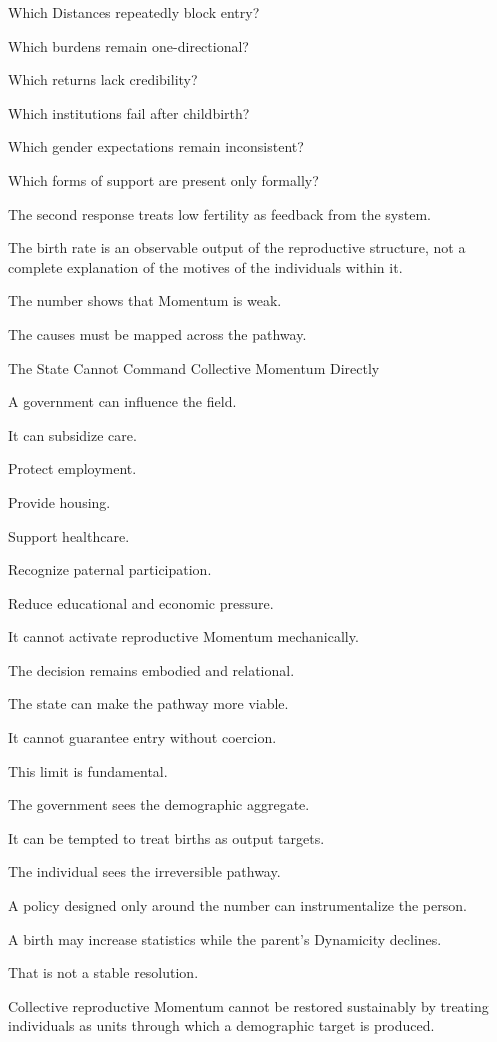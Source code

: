 Which Distances repeatedly block entry?

Which burdens remain one-directional?

Which returns lack credibility?

Which institutions fail after childbirth?

Which gender expectations remain inconsistent?

Which forms of support are present only formally?

The second response treats low fertility as feedback from the system.

The birth rate is an observable output of the reproductive structure, not a complete explanation of the motives of the individuals within it.

The number shows that Momentum is weak.

The causes must be mapped across the pathway.

The State Cannot Command Collective Momentum Directly

A government can influence the field.

It can subsidize care.

Protect employment.

Provide housing.

Support healthcare.

Recognize paternal participation.

Reduce educational and economic pressure.

It cannot activate reproductive Momentum mechanically.

The decision remains embodied and relational.

The state can make the pathway more viable.

It cannot guarantee entry without coercion.

This limit is fundamental.

The government sees the demographic aggregate.

It can be tempted to treat births as output targets.

The individual sees the irreversible pathway.

A policy designed only around the number can instrumentalize the person.

A birth may increase statistics while the parent’s Dynamicity declines.

That is not a stable resolution.

Collective reproductive Momentum cannot be restored sustainably by treating individuals as units through which a demographic target is produced.


